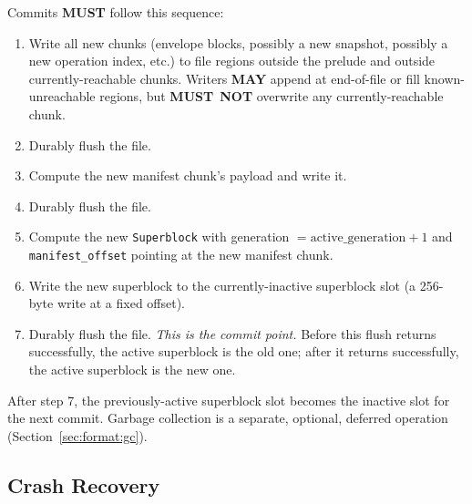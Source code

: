 \documentclass[11pt,letterpaper]{report}
\newcounter{requirement}[chapter]
\newcommand{\MUST}{\textbf{MUST}}
\newcommand{\MUSTNOT}{\textbf{MUST}\nobreak\ \textbf{NOT}}
\newcommand{\MAY}{\textbf{MAY}}
\begin{document}
\begin{requirement}
  \label{req:format:atomic-commit-sequence}
  Commits \MUST{} follow this sequence:

  \begin{enumerate}
    \item Write all new chunks (envelope blocks, possibly a new
      snapshot, possibly a new operation index, etc.) to file
      regions outside the prelude and outside currently-reachable
      chunks. Writers \MAY{} append at end-of-file or fill known-
      unreachable regions, but \MUSTNOT{} overwrite any
      currently-reachable chunk.
    \item Durably flush the file.
    \item Compute the new manifest chunk's payload and write it.
    \item Durably flush the file.
    \item Compute the new \texttt{Superblock} with generation
      $= \text{active\_generation} + 1$ and \texttt{manifest\_offset}
      pointing at the new manifest chunk.
    \item Write the new superblock to the currently-inactive
      superblock slot (a 256-byte write at a fixed offset).
    \item Durably flush the file. \emph{This is the commit point.}
      Before this flush returns successfully, the active superblock
      is the old one; after it returns successfully, the active
      superblock is the new one.
  \end{enumerate}

  After step 7, the previously-active superblock slot becomes the
  inactive slot for the next commit. Garbage collection is a
  separate, optional, deferred operation (Section~\ref{sec:format:gc}).
\end{requirement}

\subsection{Crash Recovery}
\end{document}
